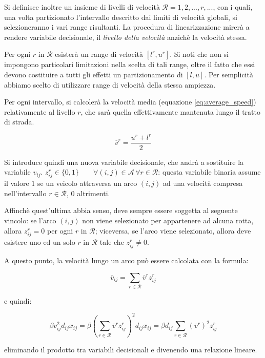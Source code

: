 	Si definisce inoltre un insieme di livelli di velocità $\mathcal{R} = {1,2,...,r,...}$, con i quali, una volta partizionato l’intervallo descritto dai limiti di velocità globali, si selezioneranno i vari range risultanti. La procedura di linearizzazione mirerà a rendere variabile decisionale, il \emph{livello della velocità} anzichè la velocità stessa.
			
	Per ogni $r$ in $\mathcal{R}$ esisterà un range di velocità $[l^r, u^r]$. Si noti che non si impongono particolari limitazioni nella scelta di tali range, oltre il fatto che essi devono costituire a tutti gli effetti un partizionamento di $[l, u]$. Per semplicità abbiamo scelto di utilizzare range di velocità della stessa ampiezza.

	Per ogni intervallo, si calcolerà la velocità media (equazione \ref{eq:average_speed}) relativamente al livello $r$, che sarà quella effettivamente mantenuta lungo il tratto di strada.

	\begin{equation}
		\label{eq:average_speed}
		\overline v ^ r = \frac{u^r + l^r}{2}
	\end{equation}

	Si introduce quindi una nuova variabile decisionale, che andrà a sostituire la variabile $v_{ij}$.
	$z_{ij}^{r} \in \{0,1\} \qquad \forall (i,j) \in \mathcal{A} \, \forall r \in \mathcal{R}$: questa variabile binaria assume il valore $1$ se un veicolo attraversa un arco $(i,j)$ ad una velocità compresa nell’intervallo $r \in \mathcal{R}$, $0$ altrimenti.

	Affinchè quest’ultima abbia senso, deve sempre essere soggetta al seguente vincolo: se l’arco $(i,j)$ non viene selezionato per appartenere ad alcuna rotta, allora $z_{ij}^r = 0$ per ogni $r$ in $\mathcal{R}$; viceversa, se l’arco viene selezionato, allora deve esistere uno ed un solo $r$ in $\mathcal{R}$ tale che $z_{ij}^r \neq 0$.

	A questo punto, la velocità lungo un arco può essere calcolata con la formula:

	$$\overline v_{ij} = \sum_{r \in \mathcal{R}} \overline v^r z_{ij}^r $$

	e quindi:

	$$\beta v_{ij}^2 d_{ij} x_{ij} = 
		\beta \left(\sum_{r \in \mathcal{R}} \overline v^r z_{ij}^r \right)^2 d_{ij} x_{ij} = 
		\beta d_{ij} \sum_{r \in \mathcal{R}} (\overline v^r)^2 z_{ij}^r
	$$

	eliminando il prodotto tra variabili decisionali e divenendo una relazione lineare.

